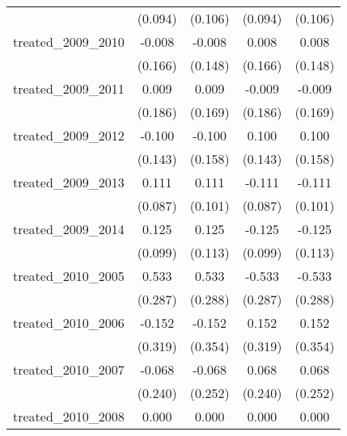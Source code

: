 {\begin{tabular}{l*{4}{c}}
            &     (0.094)         &     (0.106)         &     (0.094)         &     (0.106)         \\
[1em]
treated\_2009\_2010&      -0.008         &      -0.008         &       0.008         &       0.008         \\
            &     (0.166)         &     (0.148)         &     (0.166)         &     (0.148)         \\
[1em]
treated\_2009\_2011&       0.009         &       0.009         &      -0.009         &      -0.009         \\
            &     (0.186)         &     (0.169)         &     (0.186)         &     (0.169)         \\
[1em]
treated\_2009\_2012&      -0.100         &      -0.100         &       0.100         &       0.100         \\
            &     (0.143)         &     (0.158)         &     (0.143)         &     (0.158)         \\
[1em]
treated\_2009\_2013&       0.111         &       0.111         &      -0.111         &      -0.111         \\
            &     (0.087)         &     (0.101)         &     (0.087)         &     (0.101)         \\
[1em]
treated\_2009\_2014&       0.125         &       0.125         &      -0.125         &      -0.125         \\
            &     (0.099)         &     (0.113)         &     (0.099)         &     (0.113)         \\
[1em]
treated\_2010\_2005&       0.533         &       0.533         &      -0.533         &      -0.533         \\
            &     (0.287)         &     (0.288)         &     (0.287)         &     (0.288)         \\
[1em]
treated\_2010\_2006&      -0.152         &      -0.152         &       0.152         &       0.152         \\
            &     (0.319)         &     (0.354)         &     (0.319)         &     (0.354)         \\
[1em]
treated\_2010\_2007&      -0.068         &      -0.068         &       0.068         &       0.068         \\
            &     (0.240)         &     (0.252)         &     (0.240)         &     (0.252)         \\
[1em]
treated\_2010\_2008&       0.000         &       0.000         &       0.000         &       0.000         \\

\end{tabular}}
